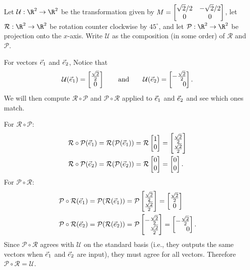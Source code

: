 \begin{example}
	Let $\mathcal U:\R^2\to\R^2$ be the transformation given by $M=\begin{bmatrix}\sqrt{2}/2&-\sqrt{2}/2\\0&0\end{bmatrix}$,
	let $\mathcal R:\R^2\to\R^2$ be rotation counter clockwise by $45^\circ$, and let $\mathcal P:\R^2\to\R^2$
	be projection onto the $x$-axis.
	Write $\mathcal U$ as the composition (in some order) of $\mathcal R$ and $\mathcal P$.

	For vectors ${\vec e_1}$ and ${\vec e_2}$, Notice that
	\[
	    \mathcal U(\xhat)=\matc{\frac{\sqrt{2}}{2}\\0}\\\qquad\text{and}\qquad \mathcal U(\yhat)=\mat{-\frac{\sqrt{2}}{2}\\0}.
	\]
	We will then compute $\mathcal R\circ \mathcal P$ and $\mathcal P\circ\mathcal R$ applied to ${\vec e_1}$ and ${\vec e_2}$ and see which ones match. 
	
	For $\mathcal R\circ \mathcal P$:
	\begin{align*}
	    \mathcal R\circ \mathcal P(\xhat)=\mathcal R(\mathcal P(\xhat))&=\mathcal R\mat{1\\0}=\mat{\frac{\sqrt{2}}{2}\\\frac{\sqrt{2}}{2}}\\
	    \mathcal R\circ \mathcal P(\yhat)=\mathcal R(\mathcal P(\yhat))&=\mathcal R\mat{0\\0}=\mat{0\\0}.
	\end{align*}
	For $\mathcal P\circ \mathcal R$:
	\begin{align*}
	    \mathcal P\circ \mathcal R(\xhat)=\mathcal P(\mathcal R(\xhat))&=\mathcal P\mat{\frac{\sqrt{2}}{2}\\\frac{\sqrt{2}}{2}}=\matc{\frac{\sqrt{2}}{2}\\0}\\
	    \mathcal P\circ \mathcal R(\yhat)=\mathcal P(\mathcal R(\yhat))&=\mathcal P\mat{-\frac{\sqrt{2}}{2}\\\frac{\sqrt{2}}{2}}=\mat{-\frac{\sqrt{2}}{2}\\0}.
	\end{align*}
	Since $\mathcal P\circ \mathcal R$ agrees with $\mathcal U$ on the standard basis (i.e., they outputs the same vectors when ${\vec e_1}$ and ${\vec e_2}$ are input), they must agree for all vectors. Therefore $\mathcal P\circ \mathcal R=\mathcal U$.
\end{example}



